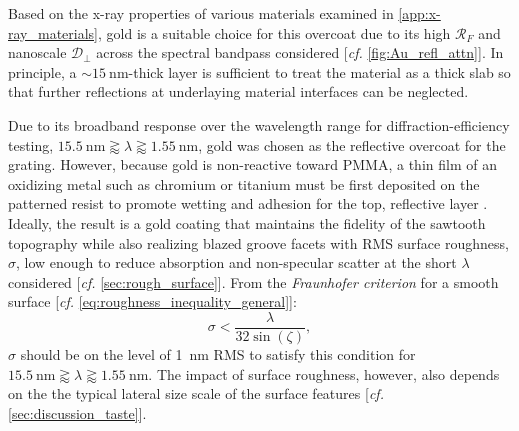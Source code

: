 Based on the x-ray properties of various materials examined in \cref{app:x-ray_materials}, gold is a suitable choice for this overcoat due to its high $\mathcal{R}_F$ and nanoscale $\mathcal{D}_{\perp}$ across the spectral bandpass considered [\emph{cf.\@} \cref{fig:Au_refl_attn}]. 
In principle, a $\sim \SI{15}{\nm}$-thick layer is sufficient to treat the material as a thick slab so that further reflections at underlaying material interfaces can be neglected. 

Due to its broadband response over the wavelength range for diffraction-efficiency testing, $\SI{15.5}{\nm} \gtrapprox \lambda \gtrapprox \SI{1.55}{\nm}$, gold was chosen as the reflective overcoat for the grating. 
However, because gold is non-reactive toward PMMA, a thin film of an oxidizing metal such as chromium or titanium must be first deposited on the patterned resist to promote wetting and adhesion for the top, reflective layer \cite[\emph{cf.\@} \cref{sec:reflectivity_polarization}]{Trolier-McKinstry17}. 
Ideally, the result is a gold coating that maintains the fidelity of the sawtooth topography while also realizing blazed groove facets with RMS surface roughness, $\sigma$, low enough to reduce absorption and non-specular scatter at the short $\lambda$ considered [\emph{cf.\@} \cref{sec:rough_surface}]. 
From the \emph{Fraunhofer criterion} for a smooth surface [\emph{cf.\@} \cref{eq:roughness_inequality_general}]: 
\begin{equation}\label{eq:roughness_inequality}
 \sigma < \frac{\lambda}{32 \sin \left( \zeta \right)} , 
 \end{equation}
$\sigma$ should be on the level of \SI{1}{\nm} RMS to satisfy this condition for $\SI{15.5}{\nm} \gtrapprox \lambda \gtrapprox \SI{1.55}{\nm}$. 
The impact of surface roughness, however, also depends on the the typical lateral size scale of the surface features [\emph{cf.\@} \cref{sec:discussion_taste}]. 

